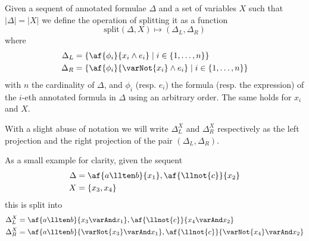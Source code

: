\begin{define}[Splitting]
	\label{def:split}
	Given a sequent of annotated formulae $\Delta$ and a set of variables $X$ such that $|\Delta| = |X|$ we define the operation of splitting it as a function
	$$ \mathrm{split}(\Delta, X) \mapsto (\Delta_L, \Delta_R) $$
	where
	\begin{align*}
		\Delta_L &= \{ \af{\phi_i}{x_i \wedge e_i} \mid i \in \{1, \dots, n\}\} \\
		\Delta_R &= \{ \af{\phi_i}{\varNot{x_i} \wedge e_i} \mid i \in \{1, \dots, n\}\}
	\end{align*}
	with $n$ the cardinality of $\Delta$, and $\phi_i$ (resp. $e_i$) the formula (resp. the expression) of the $i$-eth annotated formula in $\Delta$ using an arbitrary order.
	The same holds for $x_i$ and $X$.

	\noindent With a slight abuse of notation we will write $\Delta_L^X$ and $\Delta_R^X$ respectively as the left projection and the right projection of the pair $(\Delta_L, \Delta_R)$.
\end{define}
As a small example for clarity, given the sequent
\begin{align*}
	\Delta &= \af{a \llten b}{x_1}, \af{\llnot{c}}{x_2} \\
	X      &= \{ x_3, x_4 \} 
\end{align*}
this is split into
\begin{align*}
	\Delta_L^X &= \af{a \llten b}{x_3 \varAnd x_1}, \af{\llnot{c}}{x_4 \varAnd x_2} \\
	\Delta_R^X &= \af{a \llten b}{\varNot{x_3} \varAnd x_1}, \af{\llnot{c}}{\varNot{x_4} \varAnd x_2} 
\end{align*}

